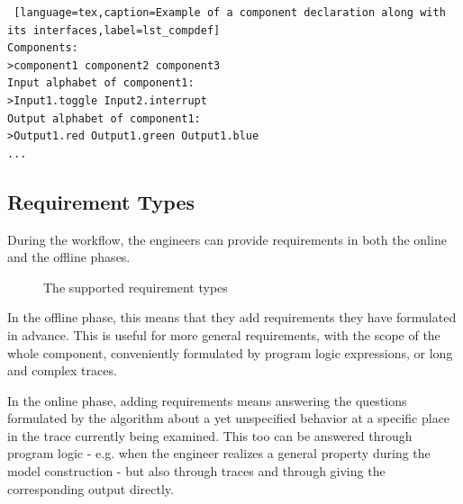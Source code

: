 \bigskip
\begin{lstlisting} [language=tex,caption=Example of a component declaration along with its interfaces,label=lst_compdef]
Components:
>component1 component2 component3
Input alphabet of component1:
>Input1.toggle Input2.interrupt
Output alphabet of component1: 
>Output1.red Output1.green Output1.blue
...
\end{lstlisting}

\subsection{Requirement Types} \label{subs_reqtypes}
During the workflow, the engineers can provide requirements in both the online and the offline phases. 

\begin{figure}[!ht] 
	\centering
	\caption{The supported requirement types}
	\label{fig_requirementtypes}
\end{figure}

In the offline phase, this means that they add requirements they have formulated in advance. This is useful for more general requirements, with the scope of the whole component, conveniently formulated by program logic expressions, or long and complex traces.

In the online phase, adding requirements means answering the questions formulated by the algorithm about a yet unspecified behavior at a specific place in the trace currently being examined. This too can be answered through program logic - e.g. when the engineer realizes a general property during the model construction - but also through traces and through giving the corresponding output directly.

